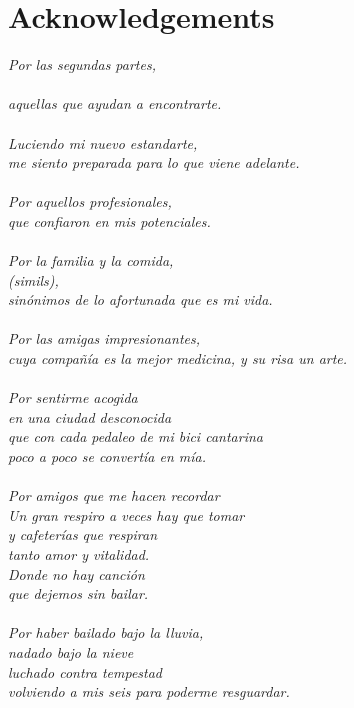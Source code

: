 \section*{Acknowledgements}

\begin{flushright}
\textit{
Por las segundas partes,\\
\\
aquellas que ayudan a encontrarte. \\
\\
Luciendo mi nuevo estandarte, \\
me siento preparada para lo que viene adelante. \\
\\[0.5cm]
Por aquellos profesionales, \\
que confiaron en mis potenciales. \\
\\
Por la familia y la comida, \\
(simils), \\
sinónimos de lo afortunada que es mi vida. \\
\\
Por las amigas impresionantes, \\
cuya compañía es la mejor medicina, y su risa un arte. \\
\\[0.5cm]
Por sentirme acogida \\
en una ciudad desconocida \\
que con cada pedaleo de mi bici cantarina \\
poco a poco se convertía en mía. \\
\\[0.5cm]
Por amigos que me hacen recordar \\
Un gran respiro a veces hay que tomar \\
y cafeterías que respiran \\
tanto amor y vitalidad. \\
Donde no hay canción \\
que dejemos sin bailar. \\
\\[0.5cm]
Por haber bailado bajo la lluvia, \\
nadado bajo la nieve \\
luchado contra tempestad \\
volviendo a mis seis para poderme resguardar. \\
\\
}
\end{flushright}
